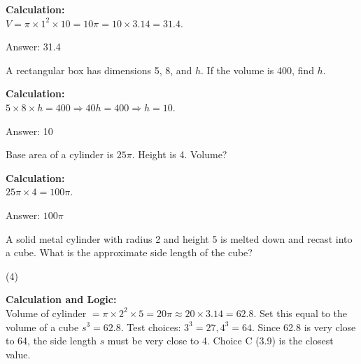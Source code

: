 \documentclass[11pt,paper=a4,answers]{exam}
\begin{document}
\begin{questions}
\begin{solution}
\textbf{Calculation:} \\
$V = \pi \times 1^2 \times 10 = 10\pi = 10 \times 3.14 = 31.4$.

\vspace{30pt}

Answer: \colorbox{yellow!100}{31.4}
\end{solution}

\vspace{60pt}

\question
A rectangular box has dimensions 5, 8, and $h$. If the volume is 400, find $h$.

\begin{solution}
\textbf{Calculation:} \\
$5 \times 8 \times h = 400 \Rightarrow 40h = 400 \Rightarrow h = 10$.

\vspace{30pt}

Answer: \colorbox{yellow!100}{10}
\end{solution}

\vspace{60pt}

\question
Base area of a cylinder is $25\pi$. Height is 4. Volume?

\begin{solution}
\textbf{Calculation:} \\
$25\pi \times 4 = 100\pi$.

\vspace{30pt}

Answer: \colorbox{yellow!100}{$100\pi$}
\end{solution}

\vspace{60pt}

\question
A solid metal cylinder with radius 2 and height 5 is melted down and recast into a cube. What is the approximate side length of the cube?
\begin{tasks}(4)
\end{tasks}

\begin{solution}
\textbf{Calculation and Logic:} \\
Volume of cylinder $= \pi \times 2^2 \times 5 = 20\pi \approx 20 \times 3.14 = 62.8$. Set this equal to the volume of a cube $s^3 = 62.8$. Test choices: $3^3 = 27, 4^3 = 64$. Since 62.8 is very close to 64, the side length $s$ must be very close to 4. Choice C (3.9) is the closest value.


\end{solution}
\end{questions}
\end{document}
